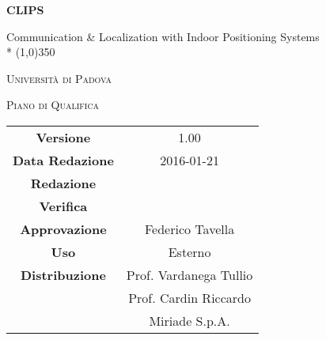 \documentclass[a4paper,12pt]{article}
\author{Oscar Elia Conti, Marco Zanella}
\date{9/12/2015}
\begin{document}
	\begin{titlepage}
		\centering
		{\huge\bfseries CLIPS\par}
	Communication \& Localization with Indoor Positioning Systems \\*
	\line(1,0){350} \\
	{\scshape\LARGE Università di Padova \par}
	\vspace{1cm}
	{\scshape\Large Piano di Qualifica \par}
	\logo
	\newpage
		\begin{tabular}{c|c}
			{\hfill \textbf{Versione}} 			& 1.00			\\
			{\hfill\textbf{Data Redazione}} 		& 2016-01-21  		\\ 
			{\hfill\textbf{Redazione}} 			&      \\
			{\hfill\textbf{Verifica}} 				&  \\ 
			{\hfill\textbf{Approvazione}} 		& Federico Tavella \\
			{\hfill\textbf{Uso}} 					& Esterno			\\
			{\hfill\textbf{Distribuzione}} 			& Prof. Vardanega Tullio \\
											& Prof. Cardin Riccardo \\
											& Miriade S.p.A.
		\end{tabular}
	\end{titlepage}
	\newpage
		\pagestyle{myfront}
		
	
	\newpage
		\tableofcontents
	\label{LastFrontPage}
	
	\newpage
	\pagestyle{mymain}
		
	\newpage
		
	
			
	\label{LastPage}
\end{document}
